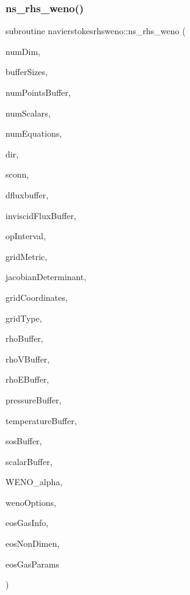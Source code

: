 \subsubsection{\texorpdfstring{ns\+\_\+rhs\+\_\+weno()}{ns\_rhs\_weno()}}
{\footnotesize\ttfamily subroutine navierstokesrhsweno\+::ns\+\_\+rhs\+\_\+weno (\begin{DoxyParamCaption}\item[{integer(kind=4)}]{num\+Dim,  }\item[{integer(kind=8), dimension(numdim)}]{buffer\+Sizes,  }\item[{integer(kind=8)}]{num\+Points\+Buffer,  }\item[{integer(kind=4)}]{num\+Scalars,  }\item[{integer(kind=4)}]{num\+Equations,  }\item[{integer(kind=4)}]{dir,  }\item[{integer(kind=4), dimension(numpointsbuffer)}]{sconn,  }\item[{real(kind=8), dimension(numequations$\ast$numpointsbuffer)}]{dfluxbuffer,  }\item[{real(kind=8), dimension(numequations$\ast$numpointsbuffer), intent(in)}]{inviscid\+Flux\+Buffer,  }\item[{integer(kind=8), dimension(2$\ast$numdim), intent(in)}]{op\+Interval,  }\item[{real(kind=8), dimension(numdim$\ast$numdim$\ast$numpointsbuffer), intent(in)}]{grid\+Metric,  }\item[{real(kind=8), dimension(2$\ast$numpointsbuffer), intent(in)}]{jacobian\+Determinant,  }\item[{real(kind=8), dimension(numdim$\ast$numpointsbuffer), intent(in)}]{grid\+Coordinates,  }\item[{integer(kind=4)}]{grid\+Type,  }\item[{real(kind=8), dimension(numpointsbuffer), intent(in)}]{rho\+Buffer,  }\item[{real(kind=8), dimension(numdim$\ast$numpointsbuffer), intent(in), target}]{rho\+V\+Buffer,  }\item[{real(kind=8), dimension(numpointsbuffer), intent(in)}]{rho\+E\+Buffer,  }\item[{real(kind=8), dimension(numpointsbuffer), intent(in)}]{pressure\+Buffer,  }\item[{real(kind=8), dimension(numpointsbuffer), intent(in)}]{temperature\+Buffer,  }\item[{real(kind=8), dimension(numpointsbuffer), intent(in)}]{sos\+Buffer,  }\item[{real(kind=8), dimension(numscalars$\ast$numpointsbuffer), intent(in), target}]{scalar\+Buffer,  }\item[{real(kind=8)}]{W\+E\+N\+O\+\_\+alpha,  }\item[{integer(kind=4), dimension(2)}]{weno\+Options,  }\item[{integer(kind=8), dimension(numgasinfos)}]{eos\+Gas\+Info,  }\item[{real(kind=8), dimension(numnondimens), intent(in)}]{eos\+Non\+Dimen,  }\item[{real(kind=8), dimension(numgasparams$\ast$(numscalars+1)), intent(in)}]{eos\+Gas\+Params }\end{DoxyParamCaption})}

